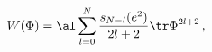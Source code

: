 \begin{equation}
W(\Phi )=\al \sum_{l=0}^{N}\frac{s_{N-l}(e^{2})}{2l+2}\tr \Phi ^{2l+2}\,,
\label{SUP}
\end{equation}


